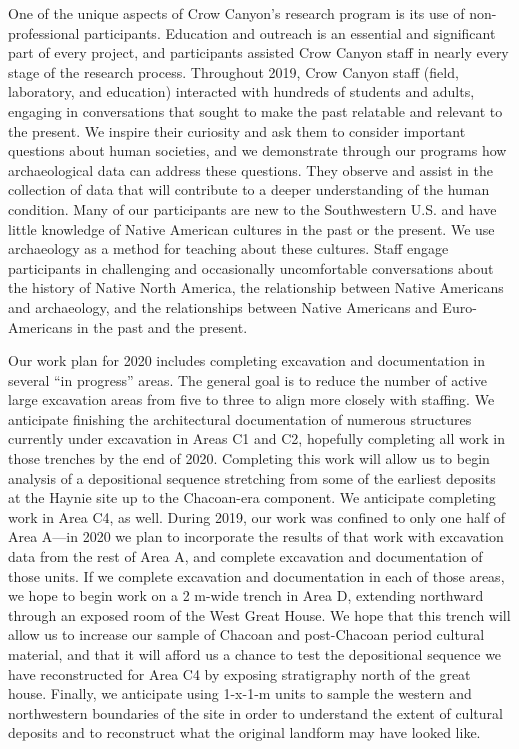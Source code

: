 \documentclass[
  12pt,
]{krantz}
\begin{document}
One of the unique aspects of Crow Canyon's research program is its use
of non-professional participants. Education and outreach is an essential
and significant part of every project, and participants assisted Crow
Canyon staff in nearly every stage of the research process. Throughout
2019, Crow Canyon staff (field, laboratory, and education) interacted
with hundreds of students and adults, engaging in conversations that
sought to make the past relatable and relevant to the present. We
inspire their curiosity and ask them to consider important questions
about human societies, and we demonstrate through our programs how
archaeological data can address these questions. They observe and assist
in the collection of data that will contribute to a deeper understanding
of the human condition. Many of our participants are new to the
Southwestern U.S. and have little knowledge of Native American cultures
in the past or the present. We use archaeology as a method for teaching
about these cultures. Staff engage participants in challenging and
occasionally uncomfortable conversations about the history of Native
North America, the relationship between Native Americans and
archaeology, and the relationships between Native Americans and
Euro-Americans in the past and the present.

Our work plan for 2020 includes completing excavation and documentation
in several ``in progress'' areas. The general goal is to reduce the number
of active large excavation areas from five to three to align more
closely with staffing. We anticipate finishing the architectural
documentation of numerous structures currently under excavation in Areas
C1 and C2, hopefully completing all work in those trenches by the end of
2020. Completing this work will allow us to begin analysis of a
depositional sequence stretching from some of the earliest deposits at
the Haynie site up to the Chacoan-era component. We anticipate
completing work in Area C4, as well. During 2019, our work was confined
to only one half of Area A---in 2020 we plan to incorporate the results
of that work with excavation data from the rest of Area A, and complete
excavation and documentation of those units. If we complete excavation
and documentation in each of those areas, we hope to begin work on a 2
m-wide trench in Area D, extending northward through an exposed room of
the West Great House. We hope that this trench will allow us to increase
our sample of Chacoan and post-Chacoan period cultural material, and
that it will afford us a chance to test the depositional sequence we
have reconstructed for Area C4 by exposing stratigraphy north of the
great house. Finally, we anticipate using 1-x-1-m units to sample the
western and northwestern boundaries of the site in order to understand
the extent of cultural deposits and to reconstruct what the original
landform may have looked like.
\end{document}
